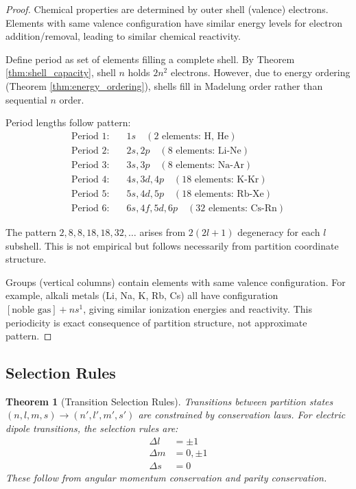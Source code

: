 \documentclass[twocolumn,10pt]{article}
\newtheorem{theorem}{Theorem}[section]
\begin{document}
\begin{proof}
Chemical properties are determined by outer shell (valence) electrons. Elements with same valence configuration have similar energy levels for electron addition/removal, leading to similar chemical reactivity.

Define period as set of elements filling a complete shell. By Theorem \ref{thm:shell_capacity}, shell $n$ holds $2n^2$ electrons. However, due to energy ordering (Theorem \ref{thm:energy_ordering}), shells fill in Madelung order rather than sequential $n$ order.

Period lengths follow pattern:
\begin{align}
\text{Period 1:} & \quad 1s \quad (2 \text{ elements: H, He}) \\
\text{Period 2:} & \quad 2s, 2p \quad (8 \text{ elements: Li-Ne}) \\
\text{Period 3:} & \quad 3s, 3p \quad (8 \text{ elements: Na-Ar}) \\
\text{Period 4:} & \quad 4s, 3d, 4p \quad (18 \text{ elements: K-Kr}) \\
\text{Period 5:} & \quad 5s, 4d, 5p \quad (18 \text{ elements: Rb-Xe}) \\
\text{Period 6:} & \quad 6s, 4f, 5d, 6p \quad (32 \text{ elements: Cs-Rn})
\end{align}

The pattern $2, 8, 8, 18, 18, 32, \ldots$ arises from $2(2l+1)$ degeneracy for each $l$ subshell. This is not empirical but follows necessarily from partition coordinate structure.

Groups (vertical columns) contain elements with same valence configuration. For example, alkali metals (Li, Na, K, Rb, Cs) all have configuration $[\text{noble gas}] + ns^1$, giving similar ionization energies and reactivity. This periodicity is exact consequence of partition structure, not approximate pattern.
\end{proof}

\subsection{Selection Rules}

\begin{theorem}[Transition Selection Rules]
\label{thm:selection_rules}
Transitions between partition states $(n,l,m,s) \to (n',l',m',s')$ are constrained by conservation laws. For electric dipole transitions, the selection rules are:
\begin{align}
\Delta l &= \pm 1 \\
\Delta m &= 0, \pm 1 \\
\Delta s &= 0
\end{align}
These follow from angular momentum conservation and parity conservation.
\end{theorem}
\end{document}
